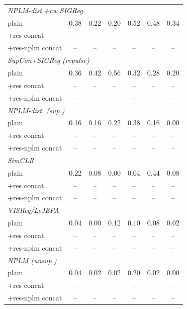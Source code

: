 \begin{center}
\begin{longtable}{lcccccc}
\multicolumn{7}{l}{\emph{NPLM-dist.+cw SIGReg}} \\
\quad plain & 0.38 & 0.22 & 0.20 & 0.52 & 0.48 & 0.34 \\
\quad +res concat & -- & -- & -- & -- & -- & -- \\
\quad +res-nplm concat & -- & -- & -- & -- & -- & -- \\
\multicolumn{7}{l}{\emph{SupCon+SIGReg (repulse)}} \\
\quad plain & 0.36 & 0.42 & 0.56 & 0.32 & 0.28 & 0.20 \\
\quad +res concat & -- & -- & -- & -- & -- & -- \\
\quad +res-nplm concat & -- & -- & -- & -- & -- & -- \\
\multicolumn{7}{l}{\emph{NPLM-dist. (sup.)}} \\
\quad plain & 0.16 & 0.16 & 0.22 & 0.38 & 0.16 & 0.00 \\
\quad +res concat & -- & -- & -- & -- & -- & -- \\
\quad +res-nplm concat & -- & -- & -- & -- & -- & -- \\
\multicolumn{7}{l}{\emph{SimCLR}} \\
\quad plain & 0.22 & 0.08 & 0.00 & 0.04 & 0.44 & 0.08 \\
\quad +res concat & -- & -- & -- & -- & -- & -- \\
\quad +res-nplm concat & -- & -- & -- & -- & -- & -- \\
\multicolumn{7}{l}{\emph{VISReg/LeJEPA}} \\
\quad plain & 0.04 & 0.00 & 0.12 & 0.10 & 0.08 & 0.02 \\
\quad +res concat & -- & -- & -- & -- & -- & -- \\
\quad +res-nplm concat & -- & -- & -- & -- & -- & -- \\
\multicolumn{7}{l}{\emph{NPLM (unsup.)}} \\
\quad plain & 0.04 & 0.02 & 0.02 & 0.20 & 0.02 & 0.00 \\
\quad +res concat & -- & -- & -- & -- & -- & -- \\
\quad +res-nplm concat & -- & -- & -- & -- & -- & -- \\
\end{longtable}
\end{center}
